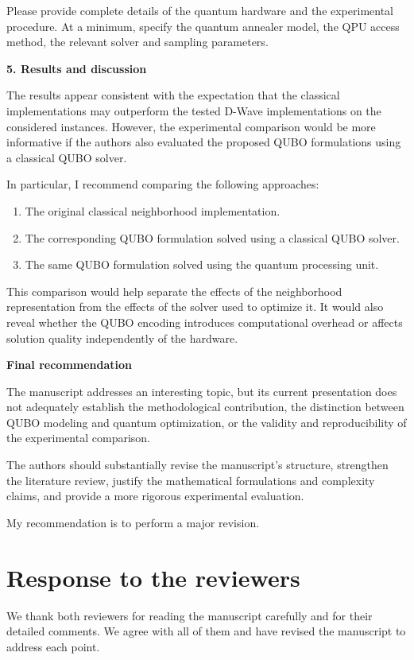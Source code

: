 \documentclass[12pt]{article}
\begin{document}
Please provide complete details of the quantum hardware and the experimental procedure. At a minimum, specify the quantum annealer model, the QPU access method, the relevant solver and sampling parameters.

\textbf{5. Results and discussion}

The results appear consistent with the expectation that the classical implementations may outperform the tested D-Wave implementations on the considered instances. However, the experimental comparison would be more informative if the authors also evaluated the proposed QUBO formulations using a classical QUBO solver.

In particular, I recommend comparing the following approaches:
\begin{enumerate}
\item The original classical neighborhood implementation.
\item The corresponding QUBO formulation solved using a classical QUBO solver.
\item The same QUBO formulation solved using the quantum processing unit.
\end{enumerate}
This comparison would help separate the effects of the neighborhood representation from the effects of the solver used to optimize it. It would also reveal whether the QUBO encoding introduces computational overhead or affects solution quality independently of the hardware.

\textbf{Final recommendation}

The manuscript addresses an interesting topic, but its current presentation does not adequately establish the methodological contribution, the distinction between QUBO modeling and quantum optimization, or the validity and reproducibility of the experimental comparison.

The authors should substantially revise the manuscript's structure, strengthen the literature review, justify the mathematical formulations and complexity claims, and provide a more rigorous experimental evaluation.

My recommendation is to perform a major revision.

\newpage
\section*{Response to the reviewers}

We thank both reviewers for reading the manuscript carefully and for their detailed comments. We agree with all of them and have revised the manuscript to address each point.
\end{document}

